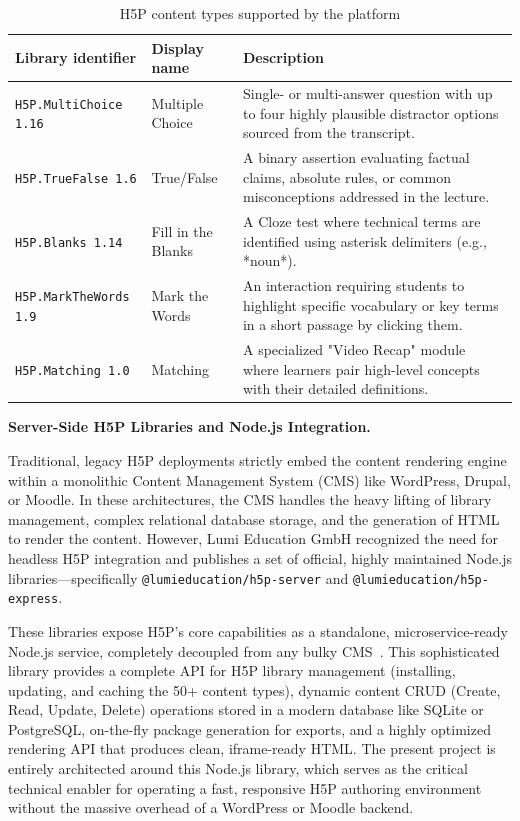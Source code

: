 \begin{table}[H]
  \centering
   \small %
  \label{tab:h5p_types}
  
  \begin{tabularx}{\linewidth}{
    >{\raggedright\arraybackslash}p{2.8cm} 
    >{\raggedright\arraybackslash}p{2.5cm} 
    X 
  }
    \toprule
    \textbf{Library identifier} & \textbf{Display name} & \textbf{Description} \\
    \midrule
    \texttt{H5P.MultiChoice 1.16} & Multiple Choice & Single- or multi-answer question with up to four highly plausible distractor options sourced from the transcript. \\
    \addlinespace
    \texttt{H5P.TrueFalse 1.6} & True/False & A binary assertion evaluating factual claims, absolute rules, or common misconceptions addressed in the lecture. \\
    \addlinespace
    \texttt{H5P.Blanks 1.14} & Fill in the Blanks & A Cloze test where technical terms are identified using asterisk delimiters (e.g., *noun*). \\
    \addlinespace
    \texttt{H5P.MarkTheWords 1.9} & Mark the Words & An interaction requiring students to highlight specific vocabulary or key terms in a short passage by clicking them. \\
    \addlinespace
    \texttt{H5P.Matching 1.0} & Matching & A specialized "Video Recap" module where learners pair high-level concepts with their detailed definitions. \\
    \bottomrule
  \end{tabularx}
    \caption{H5P content types supported by the platform}
\end{table}

\textbf{Server-Side H5P Libraries and Node.js Integration.}

Traditional, legacy H5P deployments strictly embed the content rendering engine within a monolithic Content Management System (CMS) like WordPress, Drupal, or Moodle. In these architectures, the CMS handles the heavy lifting of library management, complex relational database storage, and the generation of HTML to render the content. However, Lumi Education GmbH recognized the need for headless H5P integration and publishes a set of official, highly maintained Node.js libraries—specifically \texttt{@lumieducation/h5p-server} and \texttt{@lumieducation/h5p-express}. 

These libraries expose H5P's core capabilities as a standalone, microservice-ready Node.js service, completely decoupled from any bulky CMS~\cite{lumieducation2023}. This sophisticated library provides a complete API for H5P library management (installing, updating, and caching the 50+ content types), dynamic content CRUD (Create, Read, Update, Delete) operations stored in a modern database like SQLite or PostgreSQL, on-the-fly package generation for exports, and a highly optimized rendering API that produces clean, iframe-ready HTML. The present project is entirely architected around this Node.js library, which serves as the critical technical enabler for operating a fast, responsive H5P authoring environment without the massive overhead of a WordPress or Moodle backend.

